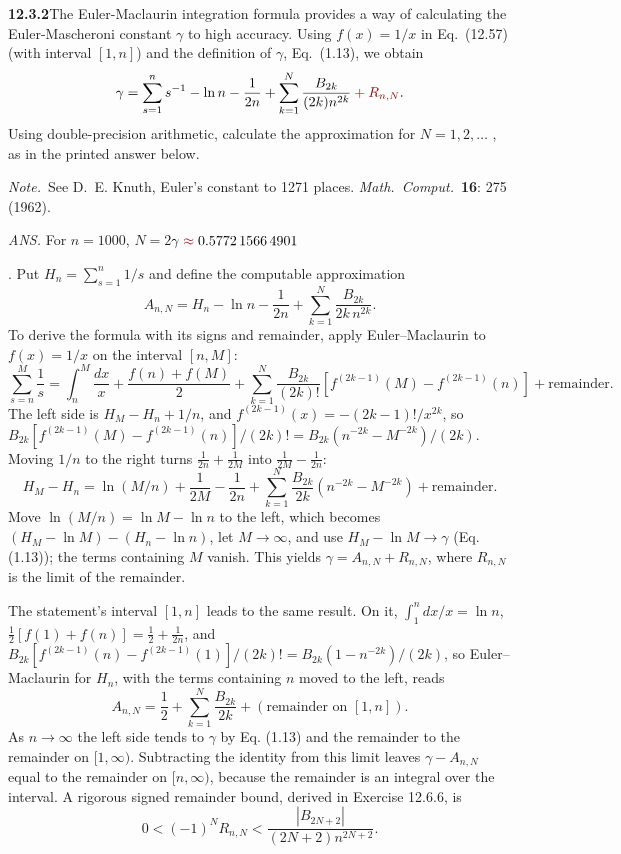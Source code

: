 \par\bigskip
\noindent\textbf{12.3.2}\quad The Euler-Maclaurin integration formula provides
a way of calculating the Euler-Mascheroni constant $\gamma$ to high accuracy.
Using $f(x)=1/x$ in Eq.~(12.57) (with interval $[1,n]$) and the definition of
$\gamma$, Eq.~(1.13), we obtain
\[
\gamma=\sum_{s=1}^{n}s^{-1}-\ln n-\frac{1}{2n}
+\sum_{k=1}^{N}\frac{B_{2k}}{(2k)n^{2k}}\erratum{{}+R_{n,N}}.
\]
Using double-precision arithmetic, calculate the approximation for
$N=1,2,\ldots$ , as in the printed answer below.

\emph{Note.}~See D.~E. Knuth, Euler's constant to 1271 places.
\emph{Math.\ Comput.}~\textbf{16}: 275 (1962).
\par\nobreak\hfill\emph{ANS.}\enspace
For $n=1000$, $N=2$\quad$\gamma\mathrel{\erratum{\approx}}0.5772\,1566\,4901$
\par\nobreak\hfill{}.
\solution
{}
Put $H_n=\sum_{s=1}^n1/s$ and define the computable approximation
\[
A_{n,N}=H_n-\ln n-\frac1{2n}
 +\sum_{k=1}^N\frac{B_{2k}}{2k\,n^{2k}}.
\]
To derive the formula with its signs and remainder, apply
Euler--Maclaurin to $f(x)=1/x$ on the interval $[n,M]$:
\[
\sum_{s=n}^{M}\frac1s=\int_n^M\frac{dx}{x}+\frac{f(n)+f(M)}2
+\sum_{k=1}^N\frac{B_{2k}}{(2k)!}
\left[f^{(2k-1)}(M)-f^{(2k-1)}(n)\right]+\text{remainder}.
\]
The left side is $H_M-H_n+1/n$, and
$f^{(2k-1)}(x)=-(2k-1)!/x^{2k}$, so
$B_{2k}[f^{(2k-1)}(M)-f^{(2k-1)}(n)]/(2k)!
=B_{2k}(n^{-2k}-M^{-2k})/(2k)$. Moving $1/n$ to the right turns
$\frac1{2n}+\frac1{2M}$ into $\frac1{2M}-\frac1{2n}$:
\[
H_M-H_n=\ln(M/n)+\frac1{2M}-\frac1{2n}
 +\sum_{k=1}^N\frac{B_{2k}}{2k}
 (n^{-2k}-M^{-2k})+\text{remainder}.
\]
Move $\ln(M/n)=\ln M-\ln n$ to the left, which becomes
$(H_M-\ln M)-(H_n-\ln n)$, let $M\to\infty$, and
use $H_M-\ln M\to\gamma$ (Eq. (1.13)); the terms containing $M$ vanish.
This yields $\gamma=A_{n,N}+R_{n,N}$, where $R_{n,N}$ is the limit of the
remainder.

The statement's interval $[1,n]$ leads to the same result. On it,
$\int_1^n dx/x=\ln n$, $\frac12[f(1)+f(n)]=\frac12+\frac1{2n}$, and
$B_{2k}[f^{(2k-1)}(n)-f^{(2k-1)}(1)]/(2k)!=B_{2k}(1-n^{-2k})/(2k)$, so
Euler--Maclaurin for $H_n$, with the terms containing $n$ moved to the
left, reads
\[
A_{n,N}=\frac12+\sum_{k=1}^N\frac{B_{2k}}{2k}
+(\text{remainder on }[1,n]).
\]
As $n\to\infty$ the left side tends to $\gamma$ by Eq. (1.13) and the
remainder to the remainder on $[1,\infty)$. Subtracting the identity from
this limit leaves $\gamma-A_{n,N}$ equal to the remainder on $[n,\infty)$,
because the remainder is an integral over the interval.
A rigorous signed remainder
bound, derived in Exercise 12.6.6, is
\[
0<(-1)^N R_{n,N}
<\frac{|B_{2N+2}|}{(2N+2)n^{2N+2}}.
\]

